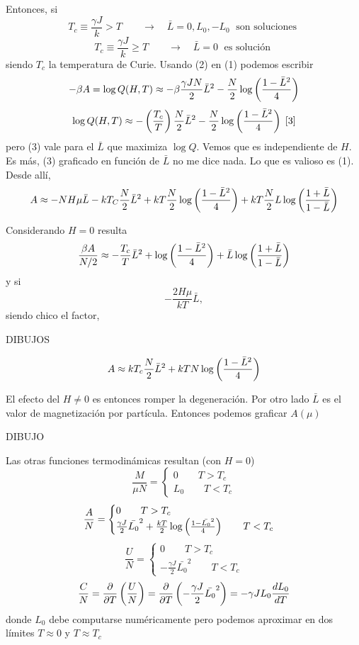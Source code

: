 \documentclass[10pt,oneside]{CBFT_book}
\begin{document}
Entonces, si
\[
	T_c \equiv \frac{\gamma J}{k} > T \qquad \rightarrow \quad \bar{L} = 0, L_0, -L_0 \; 
	\text{ son soluciones } 
\]
\[
	T_c \equiv \frac{\gamma J}{k} \geq T \qquad \rightarrow \quad \bar{L} = 0 \; 
	\text{ es solución } 
\]
siendo $T_c$ la temperatura de Curie.
Usando (2) en (1) podemos escribir 
\[
	- \beta A = \log Q(H,T) \approx - \beta \frac{\gamma J N}{2} \bar{L}^2 
	- \frac{N}{2} \log \left( \frac{ 1-\bar{L}^2 }{ 4 } \right)
\]
\[
	\log Q(H,T) \approx - \left( \frac{ T_c }{ T } \right)\frac{N}{2}\bar{L}^2 - \frac{N}{2} \log \left( \frac{ 1-\bar{L}^2 }{ 4 } \right)
	\; [3]
\]
pero (3) vale para el $\bar{L}$ que maximiza $\log Q$. Vemos que es independiente de $H$.
Es más, (3) graficado en función de $\bar{L}$ no me dice nada. Lo que es valioso es (1).
Desde allí,
\[
	A \approx -NH\mu \bar{L} - kT_C \frac{N}{2}\bar{L}^2  + kT\frac{N}{2} \log \left( \frac{ 1-\bar{L}^2 }{ 4 } \right)
	+ kT \frac{N}{2} L \log \left( \frac{ 1+\bar{L} }{ 1-\bar{L} } \right)
\]

Considerando $H=0$ resulta
\[
	\frac{\beta A}{N/2} \approx -\frac{T_c}{T} \bar{L}^2 + \log \left( \frac{ 1-\bar{L}^2 }{ 4 } \right)
	+ \bar{L} \log \left( \frac{ 1+\bar{L} }{ 1-\bar{L} } \right)
\]
y si 
\[
	-\frac{2H\mu}{kT}\bar{L},
\]
siendo chico el factor,

DIBUJOS

\[
	A \approx k T_c \frac{N}{2} \bar{L}^2 + k T N \log \left( \frac{ 1-\bar{L}^2 }{ 4 } \right)
\]

El efecto del $H\neq 0$ es entonces romper la degeneración. Por otro lado $\bar{L}$ es el valor de
magnetización por partícula. Entonces podemos graficar $A(\mu)$

DIBUJO

Las otras funciones termodinámicas resultan (con $H=0$)
\[
	\frac{M}{\mu N} = \begin{cases}
	                   0 \qquad T > T_c \\
	                   L_0 \qquad T< T_c
	                  \end{cases}
\]
\[
	\frac{A}{N} = \begin{cases}
	                   0 \qquad T > T_c \\
	                   \frac{\gamma J}{2}\bar{L_0}^2 + \frac{kT}{2} \log \left( \frac{ 1-\bar{L_0}^2 }{ 4 } \right)
	                   \qquad T< T_c
	                  \end{cases}
\]
\[
	\frac{U}{N} = \begin{cases}
	                   0 \qquad T > T_c \\
	                   -\frac{\gamma J}{2}\bar{L_0}^2 \qquad T< T_c
	                  \end{cases}
\]
\[
	\frac{C}{N} = \frac{\partial^{\hspace{-0.05em}} {}}{\partial {T}^{\hspace{-0.05em}}}\left( \frac{ U }{ N } \right) = \frac{\partial^{\hspace{-0.05em}} {}}{\partial {T}^{\hspace{-0.05em}}}\left(-\frac{\gamma J}{2}\bar{L_0}^2 \right)
	= - \gamma J L_0 \frac{d^{\hspace{-0.05em}} {L_0}}{d {T}^{\hspace{-0.05em}}}
\]
donde $L_0$ debe computarse numéricamente pero podemos aproximar en dos límites $T\approx 0$ y $T\approx T_c$
\end{document}
